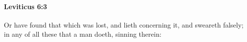 
		\paragraph{Leviticus 6:3} %
			\label{LEVITICUS-6-3}

			Or have found that which was lost, and lieth concerning it, and sweareth falsely; in any of all these that a man doeth, sinning therein:



